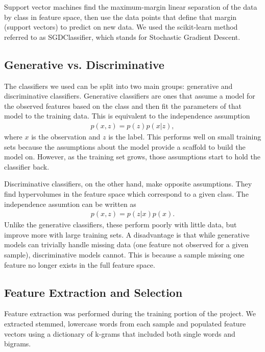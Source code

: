 \documentclass{article} %
\begin{document}
	Support vector machines find the maximum-margin linear separation of the data by class in feature space, then use the data points that define that margin (support vectors) to predict on new data. We used the scikit-learn method referred to as SGDClassifier, which stands for Stochastic Gradient Descent.
		
	\subsection{Generative vs. Discriminative}
	
	The classifiers we used can be split into two main groups: generative and discriminative classifiers. Generative classifiers are ones that assume a model for the observed features based on the class and then fit the parameters of that model to the training data. This is equivalent to the independence assumption
	\begin{align}
	p(x,z) = p(z)p(x|z),
	\end{align}
	where $x$ is the observation and $z$ is the label. This performs well on small training sets because the assumptions about the model provide a scaffold to build the model on. However, as the training set grows, those assumptions start to hold the classifier back.
	
	Discriminative classifiers, on the other hand, make opposite assumptions. They find hypervolumes in the feature space which correspond to a given class. The independence assumtion can be written as 
	\begin{align}
	p(x,z) = p(z|x)p(x).
	\end{align}
	Unlike the generative classifiers, these perform poorly with little data, but improve more with large training sets. A disadvantage is that while generative models can trivially handle missing data (one feature not observed for a given sample), discriminative models cannot. This is because a sample missing one feature no longer exists in the full feature space.
	
	\subsection{Feature Extraction and Selection}
	
	Feature extraction was performed during the training portion of the project. We extracted stemmed, lowercase words from each sample and populated feature vectors using a dictionary of k-grams that included both single words and bigrams. 
	
\end{document}

